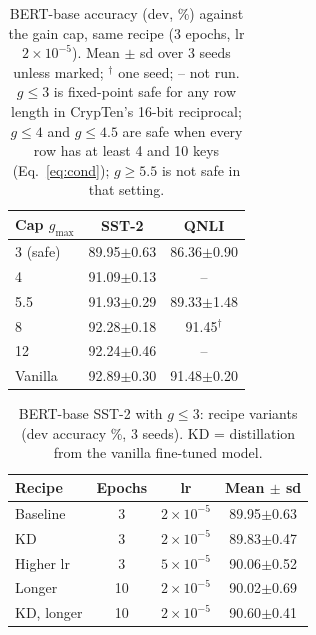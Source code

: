 \documentclass[11pt]{article}
\begin{document}
\begin{table}[tbp]\centering\small
\caption{BERT-base accuracy (dev, \%) against the gain cap, same recipe (3 epochs, lr $2\!\times\!10^{-5}$). Mean $\pm$ sd over 3 seeds
unless marked; $^\dagger$ one seed; -- not run. $g\le3$ is fixed-point safe for any row length in CrypTen's 16-bit reciprocal; $g\le4$ and $g\le4.5$ are safe when every row has at least 4 and 10 keys (Eq.~\eqref{eq:cond}); $g\ge5.5$ is not safe in that setting.}\label{tab:gsweep}
\begin{tabular}{@{}lcc@{}}\toprule
Cap $g_{\max}$ & SST-2 & QNLI\\\midrule
3 (safe) & 89.95$\pm$0.63 & 86.36$\pm$0.90\\
4 & 91.09$\pm$0.13 & --\\
5.5 & 91.93$\pm$0.29 & 89.33$\pm$1.48\\
8 & 92.28$\pm$0.18 & 91.45$^\dagger$\\
12 & 92.24$\pm$0.46 & --\\
Vanilla & 92.89$\pm$0.30 & 91.48$\pm$0.20\\\bottomrule
\end{tabular}
\end{table}

\begin{table}[tbp]\centering\small
\caption{BERT-base SST-2 with $g\le3$: recipe variants (dev accuracy \%, 3 seeds). KD = distillation from the vanilla fine-tuned
model.}\label{tab:var}
\begin{tabular}{@{}lccc@{}}\toprule
Recipe & Epochs & lr & Mean $\pm$ sd\\\midrule
Baseline & 3 & $2\!\times\!10^{-5}$ & 89.95$\pm$0.63\\
KD & 3 & $2\!\times\!10^{-5}$ & 89.83$\pm$0.47\\
Higher lr & 3 & $5\!\times\!10^{-5}$ & 90.06$\pm$0.52\\
Longer & 10 & $2\!\times\!10^{-5}$ & 90.02$\pm$0.69\\
KD, longer & 10 & $2\!\times\!10^{-5}$ & 90.60$\pm$0.41\\\bottomrule
\end{tabular}
\end{table}
\end{document}
